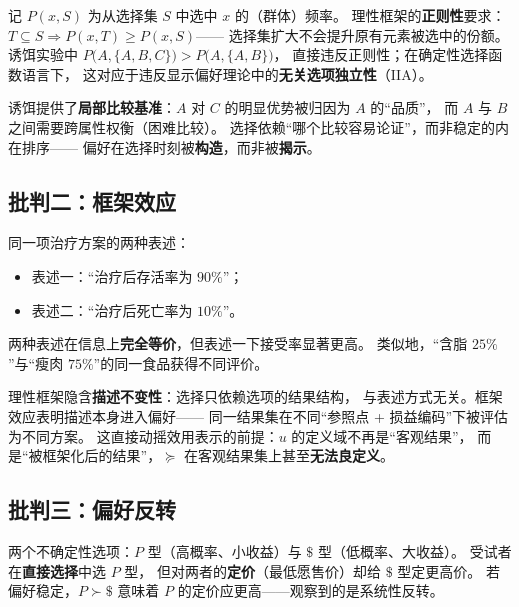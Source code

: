 \begin{proposition}[诱饵效应违反正则性]\label{prop:decoy}
记 $P(x,S)$ 为从选择集 $S$ 中选中 $x$ 的（群体）频率。
理性框架的\textbf{正则性}要求：$T\subseteq S\Rightarrow P(x,T)\ge P(x,S)$——
选择集扩大不会提升原有元素被选中的份额。
诱饵实验中 $P\bigl(A,\{A,B,C\}\bigr)>P\bigl(A,\{A,B\}\bigr)$，
直接违反正则性；在确定性选择函数语言下，
这对应于违反显示偏好理论中的\textbf{无关选项独立性}（IIA）。
\end{proposition}

\begin{remark}[机制]
诱饵提供了\textbf{局部比较基准}：$A$ 对 $C$ 的明显优势被归因为 $A$ 的“品质”，
而 $A$ 与 $B$ 之间需要跨属性权衡（困难比较）。
选择依赖“哪个比较容易论证”，而非稳定的内在排序——
偏好在选择时刻被\textbf{构造}，而非被\textbf{揭示}。
\end{remark}

\subsection{批判二：框架效应}

\begin{example}[生存率与死亡率]\label{ex:framing}
同一项治疗方案的两种表述：
\begin{itemize}
  \item 表述一：“治疗后存活率为 $90\%$”；
  \item 表述二：“治疗后死亡率为 $10\%$”。
\end{itemize}
两种表述在信息上\textbf{完全等价}，但表述一下接受率显著更高。
类似地，“含脂 $25\%$”与“瘦肉 $75\%$”的同一食品获得不同评价。
\end{example}

\begin{remark}
理性框架隐含\textbf{描述不变性}：选择只依赖选项的结果结构，
与表述方式无关。框架效应表明描述本身进入偏好——
同一结果集在不同“参照点 + 损益编码”下被评估为不同方案。
这直接动摇效用表示的前提：$u$ 的定义域不再是“客观结果”，
而是“被框架化后的结果”，$\succeq$ 在客观结果集上甚至\textbf{无法良定义}。
\end{remark}

\subsection{批判三：偏好反转}

\begin{example}[定价与选择的矛盾]\label{ex:reversal}
两个不确定性选项：$P$ 型（高概率、小收益）与 $\$$ 型（低概率、大收益）。
受试者在\textbf{直接选择}中选 $P$ 型，
但对两者的\textbf{定价}（最低愿售价）却给 $\$$ 型定更高价。
若偏好稳定，$P\succ\$$ 意味着 $P$ 的定价应更高——观察到的是系统性反转。
\end{example}

